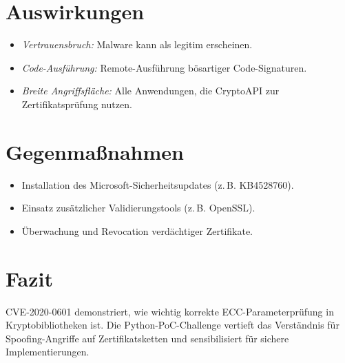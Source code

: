 \documentclass[paper=a4,fontsize=11pt]{scrartcl}
\begin{document}
\section*{Auswirkungen}
\begin{itemize}
  \item \emph{Vertrauensbruch:} Malware kann als legitim erscheinen.
  \item \emph{Code-Ausführung:} Remote-Ausführung bösartiger Code-Signaturen.
  \item \emph{Breite Angriffsfläche:} Alle Anwendungen, die CryptoAPI zur Zertifikatsprüfung nutzen.
\end{itemize}

\section*{Gegenmaßnahmen}
\begin{itemize}
  \item Installation des Microsoft-Sicherheitsupdates (z.\,B. KB4528760).
  \item Einsatz zusätzlicher Validierungstools (z.\,B. OpenSSL).
  \item Überwachung und Revocation verdächtiger Zertifikate.
\end{itemize}

\section*{Fazit}
CVE-2020-0601 demonstriert, wie wichtig korrekte ECC-Parameterprüfung in Kryptobibliotheken ist. Die Python-PoC-Challenge vertieft das Verständnis für Spoofing-Angriffe auf Zertifikatsketten und sensibilisiert für sichere Implementierungen.
\end{document}
